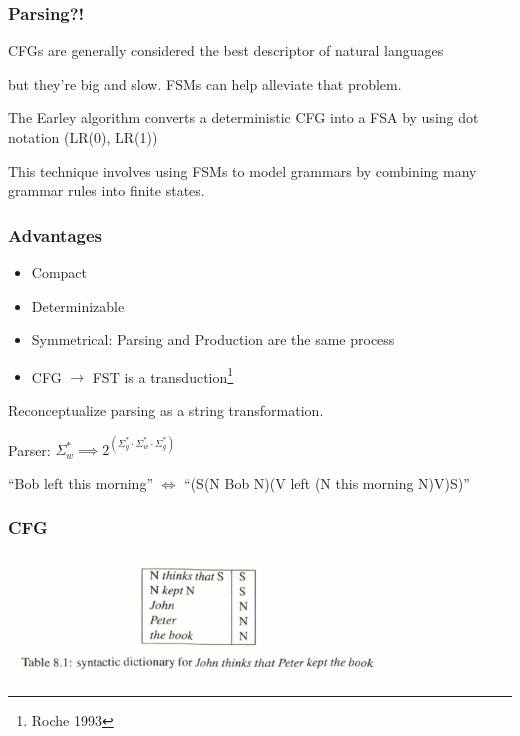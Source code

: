 \documentclass[10pt]{beamer}
\begin{document}
\begin{frame}[fragile]
  \frametitle{Parsing?!}
  
  CFGs are generally considered the best descriptor of natural languages

  \pause

  but they're big and slow. FSMs can help alleviate that problem. 

  \pause

  The Earley algorithm converts a deterministic CFG into a FSA by using dot notation (LR(0), LR(1)) 

  This technique involves using FSMs to model grammars by combining many grammar rules into finite states. 
\end{frame}

\begin{frame}[fragile]
  \frametitle{Advantages}

  \begin{itemize}[<+->]
    \item Compact
    \item Determinizable
    \item Symmetrical: Parsing and Production are the same process
    \item CFG $\to $ FST is a transduction\footnote{Roche 1993}
  \end{itemize}

  

  Reconceptualize parsing as a string transformation.

  \pause 

  Parser: $\Sigma_w^* \implies 2^{(\Sigma_g^* \cdot \Sigma_w^* \cdot \Sigma_g^*) }$
  
  \begingroup
  \fontsize{8pt}{12pt}\selectfont
  ``Bob left this morning'' $\iff$ ``(S(N Bob N)(V left (N this morning N)V)S)''
  \endgroup

\end{frame}

\begin{frame}[fragile]
  \frametitle{CFG}

  \centerline{\includegraphics[width=10cm]{table81.png}}
\end{frame}
\end{document}
